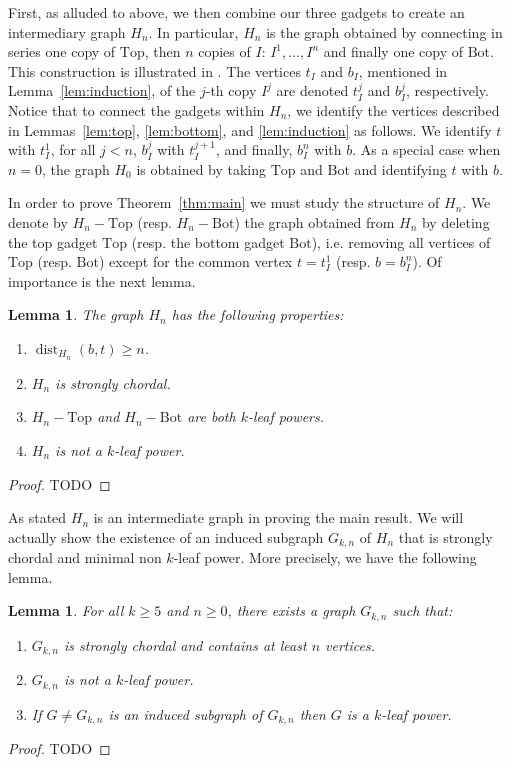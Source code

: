 \documentclass[11pt,letter]{article}
\newtheorem{lemma}[theorem]{Lemma}
\theoremstyle{remark}
\newcommand{\T}{\text{Top}}
\newcommand{\B}{\text{Bot}}
\DeclareMathOperator{\dist}{dist}
\begin{document}
First, as alluded to above, we then combine our three gadgets to create an intermediary graph $H_n$. In particular, $H_n$ is the graph obtained by connecting in series one copy of $\T$,
then $n$ copies of $I$: $I^1, \dots, I^n$ and finally one copy of $\B$.  
This construction is illustrated in .
The vertices $t_I$ and $b_I$, mentioned in Lemma~\ref{lem:induction}, of the $j$-th copy $I^j$ are denoted $t^j_I$ and $b^j_I$, respectively.
Notice that to connect the gadgets within $H_n$, we identify the vertices described in Lemmas~\ref{lem:top}, \ref{lem:bottom}, and \ref{lem:induction} as follows. We identify $t$ with $t^1_I$, for all $j < n$, $b^j_I$ with $t^{j+1}_I$, and finally, $b^n_I$ with $b$. As a special case when $n = 0$, the graph $H_0$ is obtained by taking $\T$ and $\B$ and identifying $t$ with $b$.

In order to prove Theorem~\ref{thm:main} we must study the structure of $H_n$. We denote by $H_n - \T$ (resp. $H_n - \B$) the graph obtained from $H_n$ by deleting the top gadget $\T$ (resp. the bottom gadget $\B$), i.e. removing all vertices of $\T$ (resp. $\B$) except for the common vertex $t = t_I^1$ (resp. $b = b_I^n$). Of importance is the next lemma.
\begin{lemma}\label{lem:Hn}
    The graph $H_n$ has the following properties:
    \begin{enumerate}
        \item $\dist_{H_n}(b,t) \geq n$. \label{cond:increasing}
        \item $H_n$ is strongly chordal. \label{cond:Str-Chordal}
        \item $H_n - \T$ and $H_n - \B$ are both $k$-leaf powers. \label{cond:Top/Bot}
        \item $H_n$ is not a $k$-leaf power. \label{cond:not-LP}
        \end{enumerate}
\end{lemma}
\begin{proof}
TODO
\end{proof}

As stated $H_n$ is an intermediate graph in proving the main result. 
We will actually show the existence
of an induced subgraph $G_{k,n}$ of $H_n$
that is strongly chordal and minimal non $k$-leaf power.
More precisely, we have the following lemma.

\begin{lemma}\label{lem:Gn}
    For all $k\geq 5$ and $n\geq 0$, there exists a graph $G_{k,n}$ such that:
\begin{enumerate}
    \item $G_{k,n}$ is strongly chordal and contains at least $n$ vertices.
    \item $G_{k,n}$ is not a $k$-leaf power.
    \item If $G\neq G_{k,n}$ is an induced subgraph of $G_{k,n}$ then $G$ is a $k$-leaf power.
\end{enumerate}
\end{lemma}
\begin{proof}
TODO
\end{proof}
\end{document}
